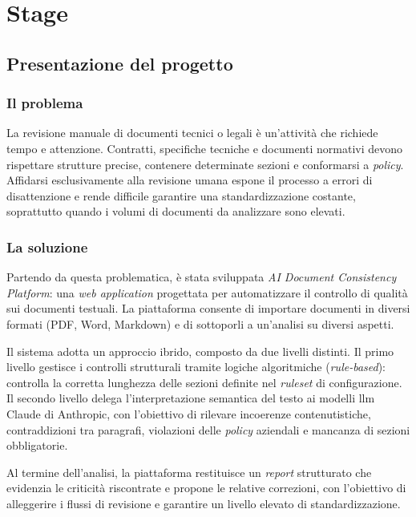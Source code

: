 \chapter{Stage}
\label{cap:stage}

\section{Presentazione del progetto}
\label{section:presentazione_progetto}

\subsection{Il problema}

La revisione manuale di documenti tecnici o legali è un'attività che richiede tempo e attenzione. Contratti, specifiche tecniche e documenti normativi devono rispettare strutture precise, contenere determinate sezioni e conformarsi a \emph{policy}. Affidarsi esclusivamente alla revisione umana espone il processo a errori di disattenzione e rende difficile garantire una standardizzazione costante, soprattutto quando i volumi di documenti da analizzare sono elevati. 

\subsection{La soluzione}

Partendo da questa problematica, è stata sviluppata \textit{AI Document Consistency Platform}: una \emph{web application} progettata per automatizzare il controllo di qualità sui documenti testuali. La piattaforma consente di importare documenti in diversi formati (PDF, Word, Markdown) e di sottoporli a un'analisi su diversi aspetti.

Il sistema adotta un approccio ibrido, composto da due livelli distinti. Il primo livello gestisce i controlli strutturali tramite logiche algoritmiche (\emph{rule-based}): controlla la corretta lunghezza delle sezioni definite nel \emph{ruleset} di configurazione. Il secondo livello delega l'interpretazione semantica del testo ai modelli \gls{llm} Claude di Anthropic, con l'obiettivo di rilevare incoerenze contenutistiche, contraddizioni tra paragrafi, violazioni delle \emph{policy} aziendali e mancanza di sezioni obbligatorie.

Al termine dell'analisi, la piattaforma restituisce un \emph{report} strutturato
che evidenzia le criticità riscontrate e propone le relative correzioni, con l'obiettivo di alleggerire i flussi di revisione e garantire un livello elevato di standardizzazione.

